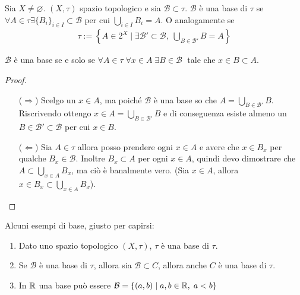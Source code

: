 \begin{definition}
	Sia $X \neq \varnothing$. $(X, \tau)$ spazio topologico e sia $\mathcal{B} \subset \tau$.  $\mathcal{B}$ è una base di $\tau$ se $\forall A \in \tau \exists \{B_i\}_{i \in I} \subset \mathcal{B}$ per cui $\bigcup_{i \in I} B_i = A$. O analogamente se
	\begin{equation}
	\begin{aligned}	
		\tau := \left\{A \in 2^X \; | \; \exists \mathcal{B}' \subset \mathcal{B} , \; \bigcup_{B \in \mathcal{B}'} B = A \right\}
	\end{aligned}
	\end{equation}
\end{definition}

\begin{proposition}
	$\mathcal{B}$ è una base se e solo se $\forall A \in \tau \; \forall x \in A \; \exists B \in \mathcal{B} \;$ tale che $x \in B \subset A$.
\end{proposition}
\begin{proof}

	\begin{enumerate}
		\item[($\Rightarrow$)] Scelgo un $x \in A$, ma poiché $\mathcal{B}$ è una base so che $A = \bigcup_{B \in \mathcal{B}'} B$. Riscrivendo ottengo $x \in A = \bigcup_{B \in \mathcal{B}'} B$ e di conseguenza esiste almeno un $B \in \mathcal{B}' \subset \mathcal{B}$ per cui $x \in B$.
		\item[($\Leftarrow$)]  Sia $A \in \tau$ allora posso prendere ogni $x \in A$ e avere che $x \in B_x$ per qualche $B_x \in \mathcal{B}$. Inoltre $B_x \subset A$ per ogni $x \in A$, quindi devo dimostrare che $A \subset \bigcup_{x \in A} B_x$, ma ciò è banalmente vero. (Sia $x \in A$, allora $x \in B_x \subset \bigcup_{x \in A} B_x$).
	\end{enumerate}
\end{proof}

Alcuni esempi di base, giusto per capirsi:
\begin{enumerate}
	\item Dato uno spazio topologico $(X,\tau)$, $\tau$ è una base di $\tau$. 
	\item Se $\mathcal{B}$ è una base di $\tau$, allora sia $\mathcal{B} \subset C$, allora anche $C$ è una base di $\tau$.
	\item In $\mathbb{R}$ una base può essere $\mathcal{B} = \{(a,b) \; | \; a,b \in \mathbb{R}, \; a < b \}$
\end{enumerate}



